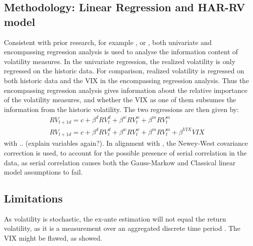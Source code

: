 \subsection{Methodology: Linear Regression and HAR-RV model}
Consistent with prior research, for example \textcite{jiang2003}, \textcite{canina1993} or \textcite{christensen1998}, both univariate and encompassing regression analysis is used to analyse the information content of volatility measures. In the univariate regression, the realized volatility is only regressed on the historic data. For comparison, realized volatility is regressed on both historic data and the VIX in the encompassing regression analysis. Thus the encompassing regression analysis gives information about the relative importance of the volatility measures, and whether the VIX as one of them subsumes the information from the historic volatility. The two regressions are then given by:
\begin{align}
RV_{t+1d} = c + \beta^{d} RV^{d}_{t} + \beta^{w} RV^{w}_{t} + \beta^{m} RV^{m}_{t}  \\
RV_{t+1d} = c + \beta^{d} RV^{d}_{t} + \beta^{w} RV^{w}_{t} + \beta^{m} RV^{m}_{t} + \beta^{VIX} VIX
\end{align}
with .. (explain variables again?). In alignment with \textcite{corsi2009}, the Newey-West covariance correction is used, to account for the possible presence of serial correlation in the data, as serial correlation causes both the Gauss-Markow and Classical linear model assumptions to fail. 


\subsection{Limitations}
As volatility is stochastic, the ex-ante estimation will not equal the return volatility, as it is a measurement over an aggregated discrete time period \parencite{andersen2001}.
The VIX might be flawed, as \textcite{jiang2007} showed.
